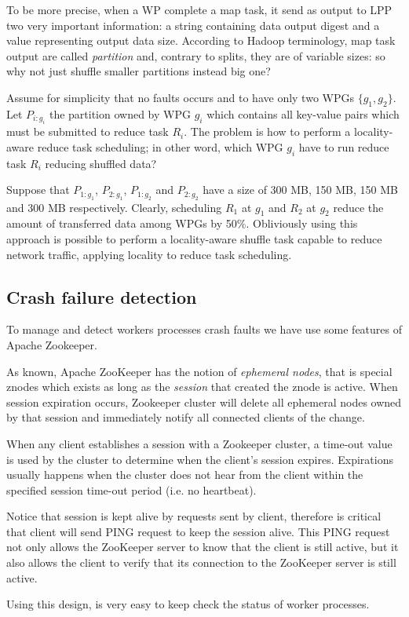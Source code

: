 \documentclass[sigchi]{acmart}
\begin{document}
To be more precise, when a WP complete a map task, it send as output to LPP two very important information: a string containing data output digest and a value representing output data size. According to Hadoop terminology, map task output are called \textit{partition} and, contrary to splits, they are of variable sizes: so why not just shuffle smaller partitions instead big one? 

Assume for simplicity that no faults occurs and to have only two WPGs $\lbrace g_1, g_2 \rbrace$. Let $P_{i:g_i}$ the partition owned by WPG $g_i$ which contains all key-value pairs which must be submitted to reduce task $R_i$. The problem is how to perform a locality-aware reduce task scheduling; in other word, which WPG $g_i$ have to run reduce task $R_i$ reducing shuffled data?

Suppose that $P_{1:g_1}$, $P_{2:g_1}$, $P_{1:g_2}$ and $P_{2:g_2}$ have a size of 300 MB, 150 MB, 150 MB and 300 MB respectively. Clearly, scheduling $R_1$ at $g_1$ and $R_2$ at $g_2$ reduce the amount of transferred data among WPGs by 50\%. Obliviously using this approach is possible to perform a locality-aware shuffle task capable to reduce network traffic, applying locality to reduce task scheduling.  






\subsection{Crash failure detection} To manage and detect workers processes crash faults we have use some features of Apache Zookeeper. 

As known, Apache ZooKeeper has the notion of \textit{ephemeral nodes}, that is special znodes which exists as long as the \textit{session} that created the znode is active. When session expiration occurs, Zookeeper cluster will delete all ephemeral nodes owned by that session and immediately notify all connected clients of the change.

When any client establishes a session with a Zookeeper cluster, a time-out value is used by the cluster to determine when the client's session expires. Expirations usually happens when the cluster does not hear from the client within the specified session time-out period (i.e. no heartbeat).

Notice that session is kept alive by requests sent by client, therefore is critical that client will send PING request to keep the session alive. This PING request not only allows the ZooKeeper server to know that the client is still active, but it also allows the client to verify that its connection to the ZooKeeper server is still active.

Using this design, is very easy to keep check the status of worker processes.














\appendix
\end{document}
